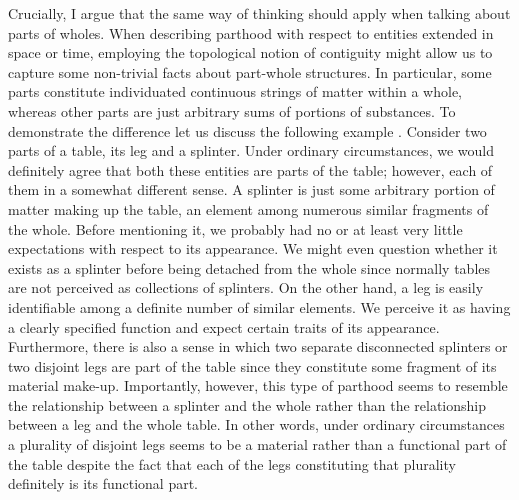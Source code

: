 Crucially, I argue that the same way of thinking should apply when talking about parts of wholes. When describing parthood with respect to entities extended in space or time, employing the topological notion of contiguity might allow us to capture some non-trivial facts about part-whole structures. In particular, some parts constitute individuated continuous strings of matter within a whole, whereas other parts are just arbitrary sums of portions of substances. To demonstrate the difference let us discuss the following example \citep[see][pp. 90--93]{acquaviva2008lexical}. Consider two parts of a table, its leg and a splinter. Under ordinary circumstances, we would definitely agree that both these entities are parts of the table; however, each of them in a somewhat different sense. A splinter is just some arbitrary portion of matter making up the table, an element among numerous similar fragments of the whole. Before mentioning it, we probably had no or at least very little expectations with respect to its appearance. We might even question whether it exists as a splinter before being detached from the whole since normally tables are not perceived as collections of splinters. On the other hand, a leg is easily identifiable among a definite number of similar elements. We perceive it as having a clearly specified function and expect certain traits of its appearance. Furthermore, there is also a sense in which two separate disconnected splinters or two disjoint legs are part of the table since they constitute some fragment of its material make-up. Importantly, however, this type of parthood seems to resemble the relationship between a splinter and the whole rather than the relationship between a leg and the whole table. In other words, under ordinary circumstances a plurality of disjoint legs seems to be a material rather than a functional part of the table despite the fact that each of the legs constituting that plurality definitely is its functional part.

